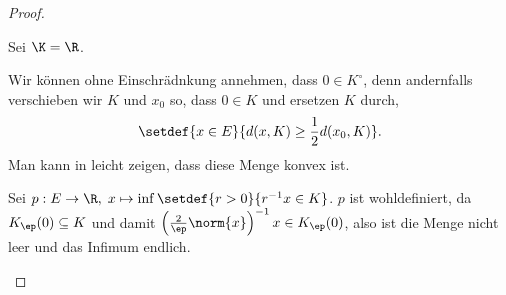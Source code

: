 \begin{proof}
\begin{proofenum}
\item Sei $\K=\R$.
\begin{defnenum}
  \item Wir können ohne Einschrädnkung annehmen, dass $0\in K^\circ$, denn
  andernfalls verschieben wir $K$ und $x_0$ so, dass $0\in K$ und ersetzen $K$
  durch,
\begin{align*}
\setdef{x\in E}{d(x,K) \ge \frac{1}{2}d(x_0,K)}.
\end{align*}
Man kann in leicht zeigen, dass diese Menge konvex ist.
\item
Sei $p: E\to \R,\; x\mapsto \inf\setdef{r>0}{r^{-1}x\in K}$. $p$ ist
wohldefiniert, da $K_\ep(0)\subseteq K$ und damit
$\left(\frac{2}{\ep}\norm{x}\right)^{-1}x\in K_\ep(0)$, also ist die Menge
nicht leer und das Infimum endlich.


\end{defnenum}
\end{proofenum}
\end{proof}
